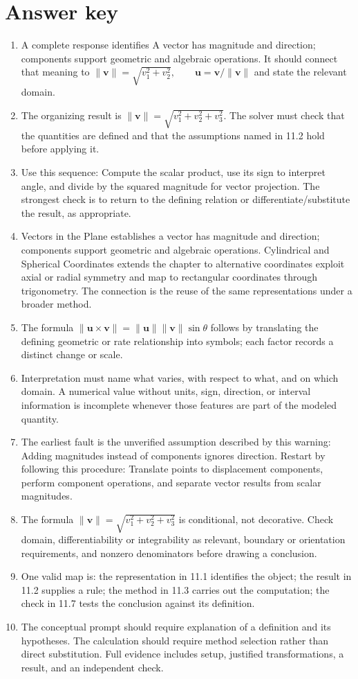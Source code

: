 \documentclass[11pt]{article}
\begin{document}
\section{Answer key}
\small
\begin{enumerate}
\item A complete response identifies A vector has magnitude and direction; components support geometric and algebraic operations. It should connect that meaning to \(\|\mathbf v\|=\sqrt{v_1^2+v_2^2},\qquad \mathbf u=\mathbf v/\|\mathbf v\|\) and state the relevant domain.
\item The organizing result is \(\|\mathbf v\|=\sqrt{v_1^2+v_2^2+v_3^2}\). The solver must check that the quantities are defined and that the assumptions named in 11.2 hold before applying it.
\item Use this sequence: Compute the scalar product, use its sign to interpret angle, and divide by the squared magnitude for vector projection. The strongest check is to return to the defining relation or differentiate/substitute the result, as appropriate.
\item Vectors in the Plane establishes a vector has magnitude and direction; components support geometric and algebraic operations. Cylindrical and Spherical Coordinates extends the chapter to alternative coordinates exploit axial or radial symmetry and map to rectangular coordinates through trigonometry. The connection is the reuse of the same representations under a broader method.
\item The formula \(\|\mathbf u\times\mathbf v\|=\|\mathbf u\|\|\mathbf v\|\sin\theta\) follows by translating the defining geometric or rate relationship into symbols; each factor records a distinct change or scale.
\item Interpretation must name what varies, with respect to what, and on which domain. A numerical value without units, sign, direction, or interval information is incomplete whenever those features are part of the modeled quantity.
\item The earliest fault is the unverified assumption described by this warning: Adding magnitudes instead of components ignores direction. Restart by following this procedure: Translate points to displacement components, perform component operations, and separate vector results from scalar magnitudes.
\item The formula \(\|\mathbf v\|=\sqrt{v_1^2+v_2^2+v_3^2}\) is conditional, not decorative. Check domain, differentiability or integrability as relevant, boundary or orientation requirements, and nonzero denominators before drawing a conclusion.
\item One valid map is: the representation in 11.1 identifies the object; the result in 11.2 supplies a rule; the method in 11.3 carries out the computation; the check in 11.7 tests the conclusion against its definition.
\item The conceptual prompt should require explanation of a definition and its hypotheses. The calculation should require method selection rather than direct substitution. Full evidence includes setup, justified transformations, a result, and an independent check.
\end{enumerate}
\normalsize
\end{document}
